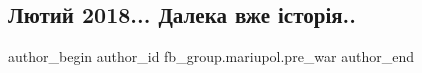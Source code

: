  
 
 
 
 

\subsection{Лютий 2018... Далека вже історія..}
\label{sec:13_02_2023.fb.fb_group.mariupol.pre_war.7.lyutii_2018__daleka_}

\ifcmt
 author_begin
   author_id fb_group.mariupol.pre_war
 author_end
\fi

